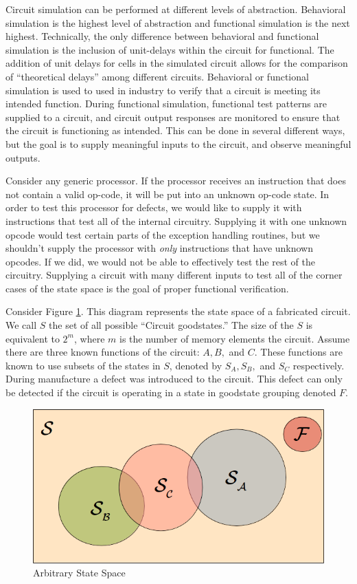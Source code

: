 Circuit simulation can be performed at different levels of abstraction. 
Behavioral simulation is the highest level of abstraction and functional simulation is the next highest. 
Technically, the only difference between behavioral and functional simulation is the inclusion of unit-delays within the circuit for functional. 
The addition of unit delays for cells in the simulated circuit allows for the comparison of ``theoretical delays'' among different circuits. 
Behavioral or functional simulation is used to used in industry to verify that a circuit is meeting its intended function. 
During functional simulation, functional test patterns are supplied to a circuit, and circuit output responses are monitored to ensure that the circuit is functioning as intended. 
This can be done in several different ways, but the goal is to supply meaningful inputs to the circuit, and observe meaningful outputs. 


Consider any generic processor.
If the processor receives an instruction that does not contain a valid op-code, it will be put into an unknown op-code state. 
In order to test this processor for defects, we would like to supply it with instructions that test all of the internal circuitry. 
Supplying it with one unknown opcode would test certain parts of the exception handling routines, but we shouldn't supply the processor with \textit{only} instructions that have unknown opcodes.
If we did, we would not be able to effectively test the rest of the circuitry. 
Supplying a circuit with many different inputs to test all of the corner cases of the state space is the goal of proper functional verification. 


Consider Figure \ref{fig:sd1}. 
This diagram represents the state space of a fabricated circuit. 
We call $S$ the set of all possible ``Circuit goodstates.''
The size of the $S$ is equivalent to $2^{m}$, where $m$ is the number of memory elements the circuit.  
Assume there are three known functions of the circuit: $A, B,$ and $C$. 
These functions are known to use subsets of the states in $S$, denoted by $S_{A}, S_{B},$ and $S_{C}$ respectively.
During manufacture a defect was introduced to the circuit. 
This defect can only be detected if the circuit is operating in a state in goodstate grouping denoted $F$.


\begin{figure}[h!]
\centering
\caption{Arbitrary State Space\label{fig:sd1}}
\includegraphics[scale=0.5]{Figures/sd1.png}
\end{figure} 

